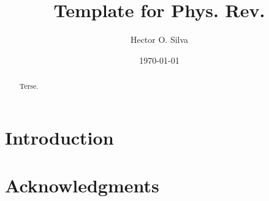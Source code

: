 \documentclass[aps, 10pt, prd, longbibliography,
               notitlepage, twocolumn, superscriptaddress,
               nofootinbib, floatfix]{revtex4-2}
\begin{document}
\title{Template for Phys. Rev.}

\begin{abstract}
Terse.
\end{abstract}

\author{Hector O. Silva}  \aei

\date{{\today}}

\maketitle

\section{Introduction} \label{sec:intro}

\section*{Acknowledgments}


\end{document}
